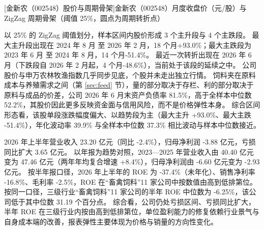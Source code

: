 \begin{center}
\begin{minipage}{\textwidth}\centering
{}

[金新农（002548）股价与周期骨架]{金新农（002548）月度收盘价（元/股）与 ZigZag 周期骨架（阈值 25\%，圆点为周期转折点）}
\end{minipage}
\end{center}

 以 25\% 的 ZigZag 阈值划分，样本区间内股价形成 3 个主升段与 4 个主跌段。 最大主升段出现在 2024 年 8 月 至 2026 年 2 月，18 个月+93.0\%；最大主跌段为 2023 年 6 月 至 2024 年 8 月，14 个月-51.4\%。 最近一次转折出现在 2026 年 6 月（下跌段自 2026 年 2 月起，4 个月-48.6\%），当前处于该段的延续之中。 公司股价与申万农林牧渔指数几乎同步见底，个股并未走出独立行情。 饲料夹在原料成本与养殖需求之间（第 \ref{sec:feed} 节），量的部分取决于存栏、利的部分取决于原料与成品的价差，公司 2026 年 6 月末资产负债率 81.5\%，高于全样本中位数 52.2\%，其股价因此更多反映资金面与信用风险，而不是价格弹性本身。 综合区间形态看，该股单段涨跌幅度偏大、以趋势段为主（最大主升 +93.0\%、最大主跌 -51.4\%），年化波动率 39.9\% 与全样本中位数 37.3\% 相比波动与样本中位数接近。

 2026 年上半年营业收入 23.20 亿元（同比 -2.4\%），归母净利润 -3.88 亿元，亏损同比扩大 3.65 亿元。 以年报为趋势对照，2023---2025 年营业收入由 40.40 亿元变为 47.46 亿元（两年年均复合增速 +8.4\%），归母净利润由 -6.60 亿元变为 -2.93 亿元。 按半年报口径，2026 年上半年的 ROE 为 -37.4\%（未年化）、销售净利率 -16.8\%、毛利率 -2.5\%，ROE 在“畜禽饲料”11 家公司中按数值由高到低排第位。 按同一口径，三级行业“畜禽饲料”11 家公司的半年 ROE 中位数为 -6.25\%，该公司低于其中位数 31.19 个百分点。 综合看，公司仍处亏损区间、亏损同比扩大，半年 ROE 在三级行业内按由高到低排第位，单位盈利能力的修复依赖行业景气与自身成本端的改善，报表弹性主要体现为价格与销量的方向性变化。

